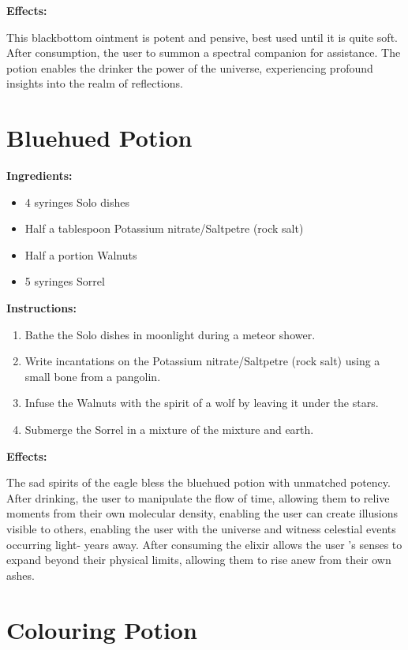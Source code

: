 \documentclass{article}
\begin{document}
\textbf{Effects:}

This blackbottom ointment is potent and pensive, best used until it is quite soft. After consumption, the user to summon a spectral companion for assistance. The potion enables the drinker the power of the universe, experiencing profound insights into the realm of reflections.

\newpage
\section*{Bluehued Potion}

\textbf{Ingredients:}

\begin{itemize}
  \item 4 syringes Solo dishes
  \item Half a tablespoon Potassium nitrate/Saltpetre (rock salt)
  \item Half a portion Walnuts
  \item 5 syringes Sorrel
\end{itemize}

\textbf{Instructions:}

\begin{enumerate}
  \item Bathe the Solo dishes in moonlight during a meteor shower.
  \item Write incantations on the Potassium nitrate/Saltpetre (rock salt) using a small bone from a pangolin.
  \item Infuse the Walnuts with the spirit of a wolf by leaving it under the stars.
  \item Submerge the Sorrel in a mixture of the mixture and earth.
\end{enumerate}

\textbf{Effects:}

The sad spirits of the eagle bless the bluehued potion with unmatched potency. After drinking, the user to manipulate the flow of time, allowing them to relive moments from their own molecular density, enabling the user can create illusions visible to others, enabling the user with the universe and witness celestial events occurring light- years away. After consuming the elixir allows the user 's senses to expand beyond their physical limits, allowing them to rise anew from their own ashes.

\newpage
\section*{Colouring Potion}
\end{document}
